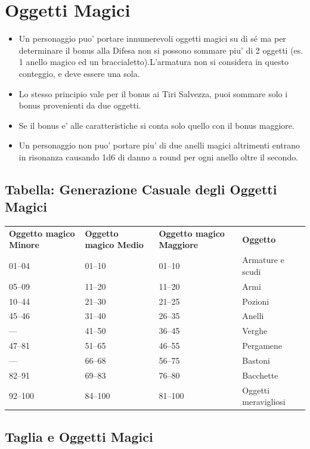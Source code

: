 \documentclass[a4paper,11pt,twoside,openany]{book}
\begin{document}
\pagebreak

\section{Oggetti Magici}

\label{oggetti-magici}
\begin{itemize}
\item 
Un personaggio puo' portare innumerevoli oggetti magici su di sé ma per determinare il bonus alla Difesa non si possono sommare piu' di 2 oggetti (es. 1 anello magico ed un braccialetto).L'armatura non si considera in questo conteggio, e deve essere una sola.
\item 
Lo stesso principio vale per il bonus ai Tiri Salvezza, puoi sommare solo i bonus provenienti da due oggetti.
\item 
Se il bonus e' alle caratteristiche si conta solo quello con il bonus maggiore.
\item 
Un personaggio non puo' portare piu' di due anelli magici altrimenti
entrano in risonanza causando 1d6 di danno a round per ogni anello oltre il secondo.
\end{itemize}



\subsection{Tabella: Generazione Casuale degli Oggetti Magici}

\label{tabella-generazione-casuale-degli-oggetti-magici}

\begin{tabular}{llll}
\toprule
\textbf{Oggetto magico Minore} &\textbf{ Oggetto magico Medio}& \textbf{Oggetto magico Maggiore} & \textbf{Oggetto}\\
01--04 & 01--10 & 01--10 & Armature e scudi\tabularnewline
05--09 & 11--20 & 11--20 & Armi\tabularnewline
10--44 & 21--30 & 21--25 & Pozioni\tabularnewline
45--46 & 31--40 & 26--35 & Anelli\tabularnewline
--- & 41--50 & 36--45 & Verghe\tabularnewline
47--81 & 51--65 & 46--55 & Pergamene\tabularnewline
--- & 66--68 & 56--75 & Bastoni\tabularnewline
82--91 & 69--83 & 76--80 & Bacchette\tabularnewline
92--100 & 84--100 & 81--100 & Oggetti meravigliosi\tabularnewline
\end{tabular}


\subsection{Taglia e Oggetti Magici}
\end{document}
